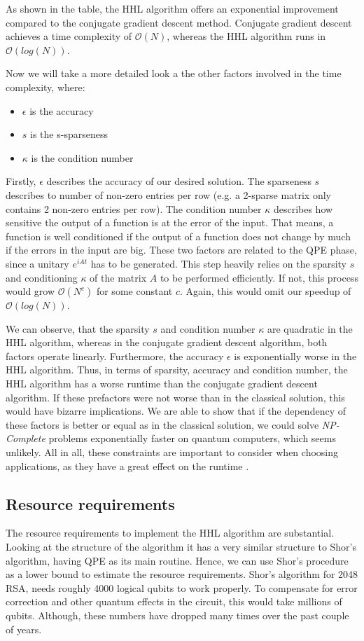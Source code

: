 As shown in the table, the HHL algorithm offers an exponential improvement compared to the conjugate gradient descent method.
Conjugate gradient descent achieves a time complexity of $\mathcal{O}(N)$, whereas the HHL algorithm runs in $\mathcal{O}(log(N))$.

Now we will take a more detailed look a the other factors involved in the time complexity, where:
\begin{itemize}
    \item $\epsilon$ is the accuracy
    \item $s$ is the s-sparseness
    \item $\kappa$ is the condition number
\end{itemize}

Firstly, $\epsilon$ describes the accuracy of our desired solution.
The sparseness $s$ describes to number of non-zero entries per row
(e.g. a 2-sparse matrix only contains 2 non-zero entries per row).
The condition number $\kappa$ describes how sensitive the output of a function is at the error of the input.
That means, a function is well conditioned if the output of a function does not change by much if the errors in the input are big.
These two factors are related to the QPE phase, since a unitary $e^{iAt}$ has to be generated. 
This step heavily relies on the sparsity $s$ and conditioning $\kappa$ of the matrix $A$ to be performed efficiently.
If not, this process would grow $\mathcal{O}(N^c)$ for some constant $c$.
Again, this would omit our speedup of $\mathcal{O}(log(N))$.

We can observe, that the sparsity $s$ and condition number $\kappa$ are quadratic in the HHL algorithm, whereas in the conjugate gradient descent algorithm, both factors operate linearly.
Furthermore, the accuracy $\epsilon$ is exponentially worse in the HHL algorithm. 
Thus, in terms of sparsity, accuracy and condition number, the HHL algorithm has a worse runtime than the conjugate gradient descent algorithm.
If these prefactors were not worse than in the classical solution, this would have bizarre implications. 
We are able to show that if the dependency of these factors is better or equal as in the classical solution, we could solve \textit{NP-Complete} problems exponentially faster on quantum computers, which seems unlikely.
All in all, these constraints are important to consider when choosing applications, as they have a great effect on the runtime \cite{fineprint}.


\subsection{Resource requirements}
The resource requirements to implement the HHL algorithm are substantial.
Looking at the structure of the algorithm it has a very similar structure to Shor's algorithm, having QPE as its main routine.
Hence, we can use Shor's procedure as a lower bound to estimate the resource requirements.
Shor's algorithm for 2048 RSA, needs roughly 4000 logical qubits to work properly. 
To compensate for error correction and other quantum effects in the circuit, this would take millions of qubits. 
Although, these numbers have dropped many times over the past couple of years.
